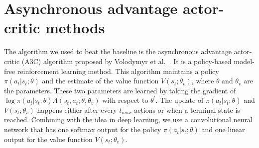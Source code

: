 


\section{Asynchronous advantage actor-critic methods}

The algorithm we used to beat the baseline is the asynchronous advantage actor-critic (A3C) algorithm proposed by Volodymyr et al.~\cite{mnih2016asynchronous}. It is a policy-based model-free reinforcement learning method. This algorithm maintains a policy $\pi (a_{t}|s_{t};\theta)$ and the estimate of the value function $V(s_{t};\theta_{v})$, where $\theta$ and $\theta_{v}$ are the parameters. These two parameters are learned by taking the gradient of $\log \pi (a_{t}|s_{t};\theta) A(s_{t},a_{t};\theta,\theta_{v})$ with respect to $\theta^{\prime}$. The update of $\pi (a_{t}|s_{t};\theta)$ and $V(s_{t};\theta_{v})$ happens either after every $t_{max}$ actions or when a terminal state is reached. Combining with the idea in deep learning, we use a convolutional neural network that has one softmax output for the policy $\pi (a_{t}|s_{t};\theta)$ and one linear output for the value function $V(s_{t};\theta_{v})$.


